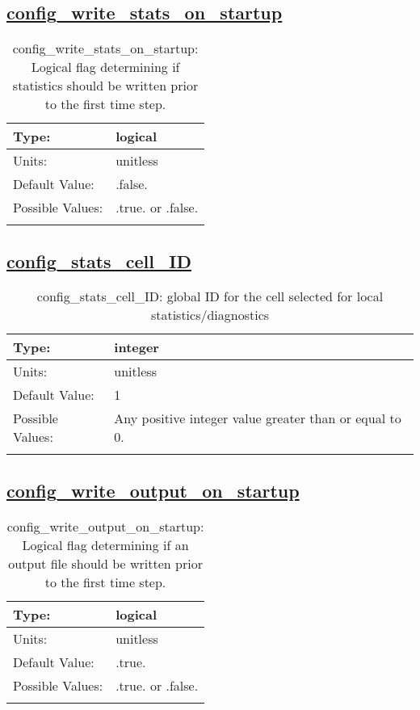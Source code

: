 \subsection[config\_write\_stats\_on\_startup]{\hyperref[sec:nm_tab_io]{config\_write\_stats\_on\_startup}}
\label{subsec:nm_sec_config_write_stats_on_startup}
\begin{center}
\begin{longtable}{| p{2.0in} || p{4.0in} |}
    \hline
    Type: & logical \\
    \hline
    Units: & \si{unitless} \\
    \hline
    Default Value: & .false. \\
    \hline
    Possible Values: & .true. or .false. \\
    \hline
    \caption{config\_write\_stats\_on\_startup: Logical flag determining if statistics should be written prior to the first time step.}
\end{longtable}
\end{center}
\subsection[config\_stats\_cell\_ID]{\hyperref[sec:nm_tab_io]{config\_stats\_cell\_ID}}
\label{subsec:nm_sec_config_stats_cell_ID}
\begin{center}
\begin{longtable}{| p{2.0in} || p{4.0in} |}
    \hline
    Type: & integer \\
    \hline
    Units: & \si{unitless} \\
    \hline
    Default Value: & 1 \\
    \hline
    Possible Values: & Any positive integer value greater than or equal to 0. \\
    \hline
    \caption{config\_stats\_cell\_ID: global ID for the cell selected for local statistics/diagnostics}
\end{longtable}
\end{center}
\subsection[config\_write\_output\_on\_startup]{\hyperref[sec:nm_tab_io]{config\_write\_output\_on\_startup}}
\label{subsec:nm_sec_config_write_output_on_startup}
\begin{center}
\begin{longtable}{| p{2.0in} || p{4.0in} |}
    \hline
    Type: & logical \\
    \hline
    Units: & \si{unitless} \\
    \hline
    Default Value: & .true. \\
    \hline
    Possible Values: & .true. or .false. \\
    \hline
    \caption{config\_write\_output\_on\_startup: Logical flag determining if an output file should be written prior to the first time step.}
\end{longtable}
\end{center}
